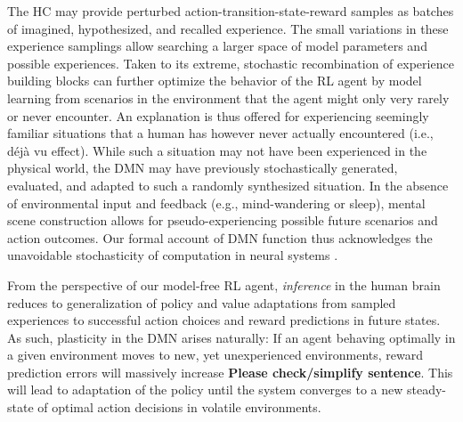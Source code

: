 \documentclass[10pt,letterpaper]{article}
\begin{document}
The HC may provide perturbed action-transition-state-reward samples
  as batches of imagined, hypothesized, and recalled experience.
  The small variations in these experience samplings allow searching
  a larger space of model parameters and possible experiences.
  Taken to its extreme, stochastic recombination of experience
  building blocks can further optimize the behavior of the RL agent
  by model learning from scenarios in the environment that the agent might
  only very rarely or never encounter.
  An explanation is thus offered for experiencing seemingly familiar situations that
  a human has however never actually encountered (i.e., d\'{e}j\`{a} vu effect).
  While such a situation may not have been experienced in the physical world,
  the DMN may have previously stochastically generated, evaluated, and adapted to
  such a randomly synthesized situation.
  In the absence of environmental input and feedback
  (e.g., mind-wandering or sleep),
  mental scene construction allows for pseudo-experiencing possible
  future scenarios and action outcomes.
  Our formal account of DMN function
  thus acknowledges the unavoidable stochasticity of
  computation in neural systems \citep{faisal2008noise}.


  From the perspective of our model-free RL agent,
  \textit{inference} in the human brain reduces to
  generalization of
  policy and value adaptations from sampled experiences to
  successful action choices and reward predictions in future states.
  As such,
  plasticity in the DMN arises naturally:
  If an agent behaving optimally in a given environment moves
  to new, yet unexperienced environments, reward prediction errors will
  massively increase \textbf{Please check/simplify sentence}.
  This will lead to adaptation of the policy until the system converges to a
  new steady-state of optimal action decisions in volatile environments.

\end{document}
